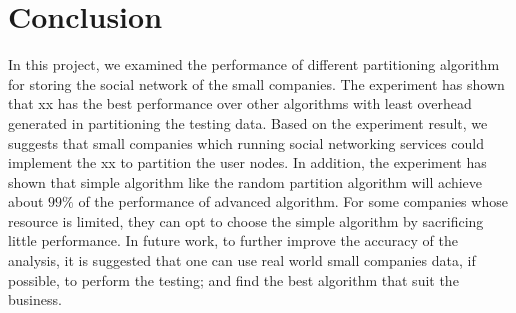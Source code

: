 \section{Conclusion}

In this project, we examined the performance of different partitioning algorithm for storing the social network of the small companies. The experiment has shown that xx has the best performance over other algorithms with least overhead generated in partitioning the testing data. Based on the experiment result, we suggests that small companies which running social networking services could implement the xx to partition the user nodes. In addition, the experiment has shown that simple algorithm like the random partition algorithm will achieve about $99\%$ of the performance of advanced algorithm. For some companies whose resource is limited, they can opt to choose the simple algorithm by sacrificing little performance. In future work, to further improve the accuracy of the analysis, it is suggested that one can use real world small companies data, if possible, to perform the testing; and find the best algorithm that suit the business.